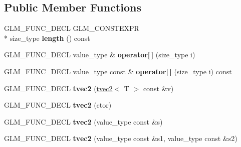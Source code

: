 \subsection*{Public Member Functions}
\begin{DoxyCompactItemize}
\item 
\hypertarget{structglm_1_1detail_1_1tvec2_ab6c8c9f40678f59192bd9cae5d462f12}{G\-L\-M\-\_\-\-F\-U\-N\-C\-\_\-\-D\-E\-C\-L G\-L\-M\-\_\-\-C\-O\-N\-S\-T\-E\-X\-P\-R \\*
size\-\_\-type {\bfseries length} () const }\label{structglm_1_1detail_1_1tvec2_ab6c8c9f40678f59192bd9cae5d462f12}

\item 
\hypertarget{structglm_1_1detail_1_1tvec2_abd2093679b295f0c184726c010f723e1}{G\-L\-M\-\_\-\-F\-U\-N\-C\-\_\-\-D\-E\-C\-L value\-\_\-type \& {\bfseries operator\mbox{[}$\,$\mbox{]}} (size\-\_\-type i)}\label{structglm_1_1detail_1_1tvec2_abd2093679b295f0c184726c010f723e1}

\item 
\hypertarget{structglm_1_1detail_1_1tvec2_aa3aece5c9e3a8239e95e748974bcf2c5}{G\-L\-M\-\_\-\-F\-U\-N\-C\-\_\-\-D\-E\-C\-L value\-\_\-type const \& {\bfseries operator\mbox{[}$\,$\mbox{]}} (size\-\_\-type i) const }\label{structglm_1_1detail_1_1tvec2_aa3aece5c9e3a8239e95e748974bcf2c5}

\item 
\hypertarget{structglm_1_1detail_1_1tvec2_a538a7f92f8c9b22ac624226ea1f48e3a}{G\-L\-M\-\_\-\-F\-U\-N\-C\-\_\-\-D\-E\-C\-L {\bfseries tvec2} (\hyperlink{structglm_1_1detail_1_1tvec2}{tvec2}$<$ T $>$ const \&v)}\label{structglm_1_1detail_1_1tvec2_a538a7f92f8c9b22ac624226ea1f48e3a}

\item 
\hypertarget{structglm_1_1detail_1_1tvec2_a17c66b75e5ad0d2c5c6c2cedd67dd4a8}{G\-L\-M\-\_\-\-F\-U\-N\-C\-\_\-\-D\-E\-C\-L {\bfseries tvec2} (ctor)}\label{structglm_1_1detail_1_1tvec2_a17c66b75e5ad0d2c5c6c2cedd67dd4a8}

\item 
\hypertarget{structglm_1_1detail_1_1tvec2_acc4a526f25f000d09ae31159e5e9069f}{G\-L\-M\-\_\-\-F\-U\-N\-C\-\_\-\-D\-E\-C\-L {\bfseries tvec2} (value\-\_\-type const \&s)}\label{structglm_1_1detail_1_1tvec2_acc4a526f25f000d09ae31159e5e9069f}

\item 
\hypertarget{structglm_1_1detail_1_1tvec2_a3da5a34afeb3d8aa42ffc449e51ce3a1}{G\-L\-M\-\_\-\-F\-U\-N\-C\-\_\-\-D\-E\-C\-L {\bfseries tvec2} (value\-\_\-type const \&s1, value\-\_\-type const \&s2)}\label{structglm_1_1detail_1_1tvec2_a3da5a34afeb3d8aa42ffc449e51ce3a1}


\end{DoxyCompactItemize}
